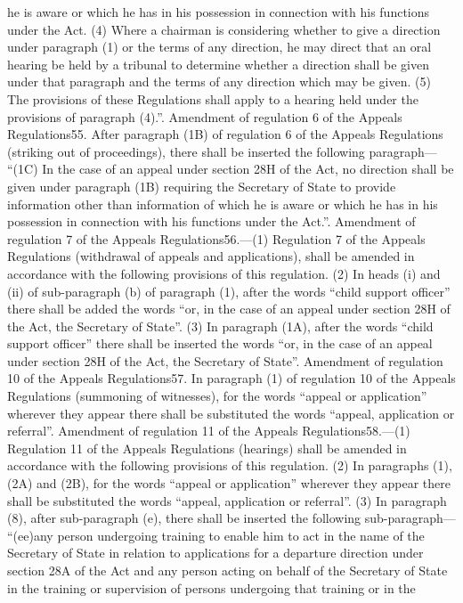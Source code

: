 \documentclass[a4paper]{article}
\begin{document}
he is aware or which he has in his possession in connection with his functions
under the Act.
(4) Where a chairman is considering whether to give a direction under paragraph
(1) or the terms of any direction, he may direct that an oral hearing be held by
a tribunal to determine whether a direction shall be given under that paragraph
and the terms of any direction which may be given.
(5) The provisions of these Regulations shall apply to a hearing held under the
provisions of paragraph (4).”.
Amendment of regulation 6 of the Appeals Regulations55. After paragraph (1B) of
regulation 6 of the Appeals Regulations (striking out of proceedings), there
shall be inserted the following paragraph—
“(1C) In the case of an appeal under section 28H of the Act, no direction shall
be given under paragraph (1B) requiring the Secretary of State to provide
information other than information of which he is aware or which he has in his
possession in connection with his functions under the Act.”.
Amendment of regulation 7 of the Appeals Regulations56.—(1) Regulation 7 of the
Appeals Regulations (withdrawal of appeals and applications), shall be amended
in accordance with the following provisions of this regulation.
(2) In heads (i) and (ii) of sub-paragraph (b) of paragraph (1), after the words
“child support officer” there shall be added the words “or, in the case of an
appeal under section 28H of the Act, the Secretary of State”.
(3) In paragraph (1A), after the words “child support officer” there shall be
inserted the words “or, in the case of an appeal under section 28H of the Act,
the Secretary of State”.
Amendment of regulation 10 of the Appeals Regulations57. In paragraph (1) of
regulation 10 of the Appeals Regulations (summoning of witnesses), for the words
“appeal or application” wherever they appear there shall be substituted the
words “appeal, application or referral”.
Amendment of regulation 11 of the Appeals Regulations58.—(1) Regulation 11 of
the Appeals Regulations (hearings) shall be amended in accordance with the
following provisions of this regulation.
(2) In paragraphs (1), (2A) and (2B), for the words “appeal or application”
wherever they appear there shall be substituted the words “appeal, application
or referral”.
(3) In paragraph (8), after sub-paragraph (e), there shall be inserted the
following sub-paragraph—
“(ee)any person undergoing training to enable him to act in the name of the
Secretary of State in relation to applications for a departure direction under
section 28A of the Act and any person acting on behalf of the Secretary of State
in the training or supervision of persons undergoing that training or in the
\end{document}
